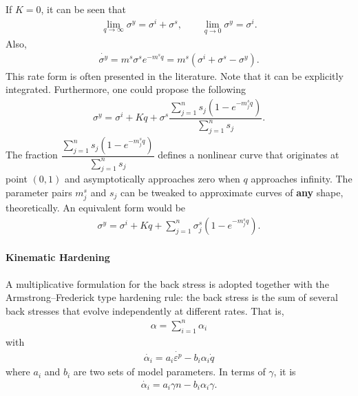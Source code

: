 If $K=0$, it can be seen that
\begin{gather}
\lim\limits_{q\rightarrow\infty}\sigma^y=\sigma^i+\sigma^s,\qquad
\lim\limits_{q\rightarrow0}\sigma^y=\sigma^i.
\end{gather}
Also,
\begin{gather}
\dot{\sigma^y}=m^s\sigma^se^{-m^sq}=m^s\left(\sigma^i+\sigma^s-\sigma^y\right).
\end{gather}
This rate form is often presented in the literature.
Note that it can be explicitly integrated.
Furthermore, one could propose the following
\begin{gather}
\sigma^y=\sigma^i+Kq+\sigma^s\dfrac{\sum_{j=1}^{n}s_j\left(1-e^{-m^s_jq}\right)}{\sum_{j=1}^{n}s_j}.
\end{gather}
The fraction $\dfrac{\sum_{j=1}^{n}s_j\left(1-e^{-m^s_jq}\right)}{\sum_{j=1}^{n}s_j}$ defines a nonlinear curve that originates at point $\left(0,1\right)$ and asymptotically approaches zero when $q$ approaches infinity.
The parameter pairs $m^s_j$ and $s_j$ can be tweaked to approximate curves of \textbf{any} shape, theoretically.
An equivalent form would be
\begin{gather}
\sigma^y=\sigma^i+Kq+\sum_{j=1}^{n}\sigma^s_j\left(1-e^{-m^s_jq}\right).
\end{gather}
\paragraph{Kinematic Hardening}
A multiplicative formulation \cite{Chaboche1989} for the back stress is adopted together with the Armstrong--Frederick type hardening rule: the back stress is the sum of several back stresses that evolve independently at different rates.
That is,
\begin{gather}
\alpha=\sum_{i=1}^n\alpha_i
\end{gather}
with
\begin{gather}\label{eq:af_kinematic}
\dot{\alpha_i}=a_i\dot{\varepsilon^p}-b_i\alpha_i\dot{q}
\end{gather}
where $a_i$ and $b_i$ are two sets of model parameters.
In terms of $\gamma$, it is
\begin{gather}
\dot{\alpha_i}=a_i\gamma{}n-b_i\alpha_i\gamma.
\end{gather}
